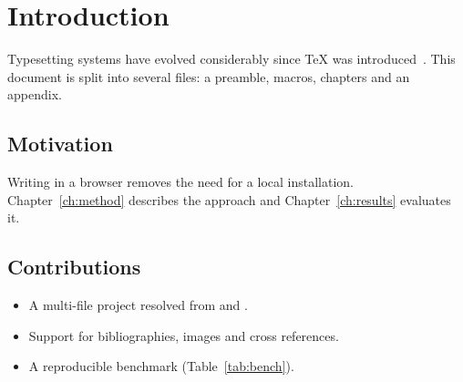 \chapter{Introduction}\label{ch:intro}

Typesetting systems have evolved considerably since \TeX{} was introduced~\cite{knuth1984}.
This document is split into several files: a preamble, macros, chapters and an appendix.

\section{Motivation}
Writing in a browser removes the need for a local installation. Chapter~\ref{ch:method}
describes the approach and Chapter~\ref{ch:results} evaluates it.

\section{Contributions}
\begin{itemize}[noitemsep]
  \item A multi-file project resolved from \verb|| and \verb||.
  \item Support for bibliographies, images and cross references.
  \item A reproducible benchmark (Table~\ref{tab:bench}).
\end{itemize}


